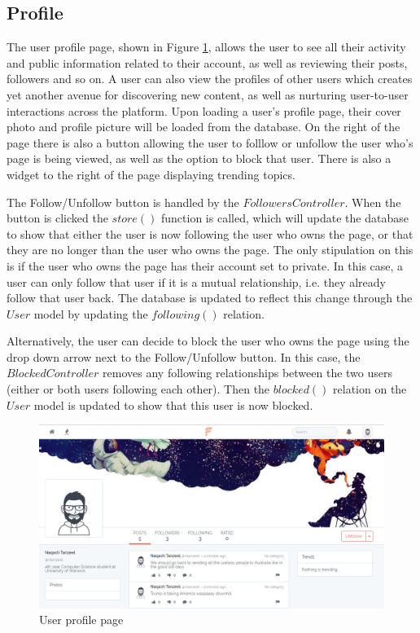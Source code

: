 \subsection{Profile}
The user profile page, shown in Figure \ref{fig:ProfilePage}, allows the user to see all their activity and public information related to their account, as well as reviewing their posts, followers and so on. A user can also view the profiles of other users which creates yet another avenue for discovering new content, as well as nurturing user-to-user interactions across the platform. Upon loading a user's profile page, their cover photo and profile picture will be loaded from the database. On the right of the page there is also a button allowing the user to folllow or unfollow the user who's page is being viewed, as well as the option to block that user. There is also a widget to the right of the page displaying trending topics.

The Follow/Unfollow button is handled by the $FollowersController$. When the button is clicked the $store()$ function is called, which will update the database to show that either the user is now following the user who owns the page, or that they are no longer than the user who owns the page. The only stipulation on this is if the user who owns the page has their account set to private. In this case, a user can only follow that user if it is a mutual relationship, i.e. they already follow that user back. The database is updated to reflect this change through the $User$ model by updating the $following()$ relation.

Alternatively, the user can decide to block the user who owns the page using the drop down arrow next to the Follow/Unfollow button. In this case, the $BlockedController$ removes any following relationships between the two users (either or both users following each other). Then the $blocked()$ relation on the $User$ model is updated to show that this user is now blocked.

\begin{figure}[H]
\centering
\includegraphics[width=\textwidth]{Images/Implementation/ProfilePage}
\caption{User profile page}
\label{fig:ProfilePage}
\end{figure}

